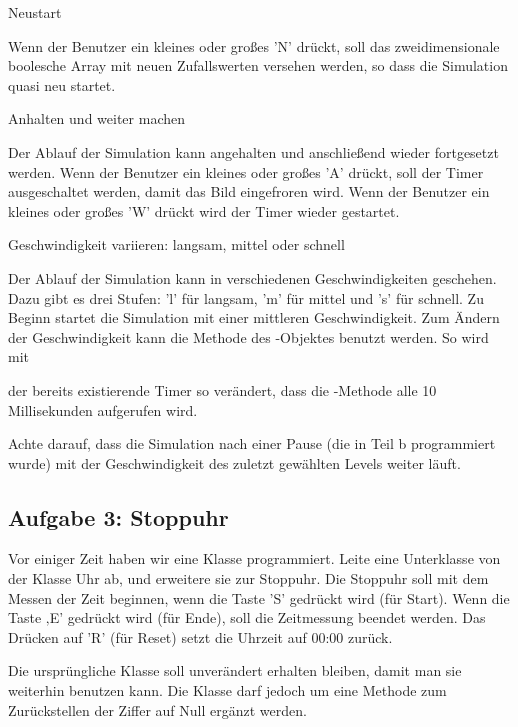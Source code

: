 \begin{compactenum}[a)]
\item Neustart

Wenn der Benutzer ein kleines oder großes ’N’ drückt, soll das zweidimensionale
boolesche Array mit neuen Zufallswerten versehen werden, so dass die Simulation
quasi neu startet.

\item Anhalten und weiter machen

Der Ablauf der Simulation kann angehalten und anschließend wieder fortgesetzt
werden. Wenn der Benutzer ein kleines oder großes ’A’ drückt, soll der Timer
ausgeschaltet werden, damit das Bild eingefroren wird. Wenn der Benutzer ein
kleines oder großes ’W’ drückt wird der Timer wieder gestartet.

\item Geschwindigkeit variieren: langsam, mittel oder schnell

Der Ablauf der Simulation kann in verschiedenen Geschwindigkeiten geschehen.
Dazu gibt es drei Stufen: ’l’ für langsam, ’m’ für mittel und ’s’ für schnell.
Zu Beginn startet die Simulation mit einer mittleren Geschwindigkeit. 
Zum Ändern der Geschwindigkeit kann die Methode  des
-Objektes benutzt werden. So wird mit


der bereits existierende Timer so verändert, dass die -Methode
alle 10 Millisekunden aufgerufen wird.

Achte darauf, dass die Simulation nach einer Pause (die in Teil b programmiert
wurde) mit der Geschwindigkeit des zuletzt gewählten Levels weiter läuft.
\end{compactenum} 


\subsection{Aufgabe 3: Stoppuhr}

Vor einiger Zeit haben wir eine Klasse  programmiert. Leite eine
Unterklasse von der Klasse Uhr ab, und erweitere sie zur Stoppuhr. Die Stoppuhr
soll mit dem Messen der Zeit beginnen, wenn die Taste ’S’ gedrückt wird (für
\glqq Start\grqq ). Wenn die Taste ‚E’ gedrückt wird (für \glqq Ende\grqq ),
soll die Zeitmessung beendet werden. Das Drücken auf ’R’ (für \glqq Reset\grqq )
setzt die Uhrzeit auf 00:00 zurück.

Die ursprüngliche Klasse  soll unverändert erhalten bleiben, damit
man sie weiterhin benutzen kann. Die Klasse  darf jedoch um eine
Methode zum Zurückstellen der Ziffer auf Null ergänzt werden.


